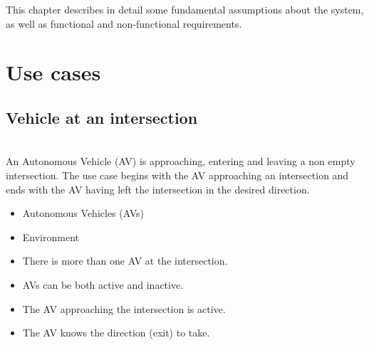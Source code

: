 \documentclass{memoir}
\begin{document}
This chapter describes in detail some fundamental assumptions about the system, as well as functional and non-functional requirements.

\section{Use cases}

\subsection{Vehicle at an intersection}
\begin{description}
	\addtolength{\itemindent}{0.5cm}
	\item[Brief Description] \hfill \\
	An Autonomous Vehicle (AV) is approaching, entering and leaving a non empty intersection. The use case begins with the AV approaching an intersection and ends with the AV having left the intersection in the desired direction. 
	
	\item[Actors] \hfill
	\begin{itemize}
		\item Autonomous Vehicles (AVs)
		\item Environment
	\end{itemize}
	
	\item[Preconditions] \hfill
	\begin{itemize}
		\item There is more than one AV at the intersection. 
		\item AVs can be both active and inactive.
		\item The AV approaching the intersection is active.
		\item The AV knows the direction (exit) to take.
	\end{itemize}
	

\end{description}
\end{document}
